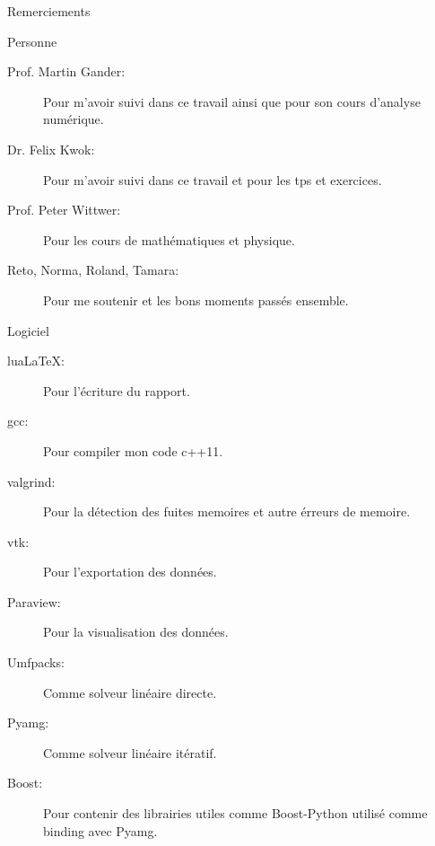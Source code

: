 \begin{frame}[shrink]{Remerciements}

\begin{block}{Personne}

\begin{description}
 \item[Prof. Martin Gander:] Pour m'avoir suivi dans ce travail ainsi que pour son cours d'analyse numérique.
 \item[Dr. Felix Kwok:] Pour m'avoir suivi dans ce travail et pour les tps et exercices.
 \item[Prof. Peter Wittwer:] Pour les cours de mathématiques et physique.
 \item[Reto, Norma, Roland, Tamara:] Pour me soutenir et les bons moments passés ensemble.
\end{description}
 \end{block}
 
 \begin{block}{Logiciel}
  \begin{description}
   \item[lua\LaTeX:] Pour l'écriture du rapport.
   \item[gcc:] Pour compiler mon code c++11.
   \item[valgrind:] Pour la détection des fuites memoires et autre érreurs de memoire.
   \item[vtk:] Pour l'exportation des données.
   \item[Paraview:] Pour la visualisation des données.
   \item[Umfpacks:] Comme solveur linéaire directe.
   \item[Pyamg:] Comme solveur linéaire itératif.
   \item[Boost:] Pour contenir des librairies utiles comme Boost-Python utilisé comme binding avec Pyamg.
  \end{description}

 \end{block}

 
\end{frame}





